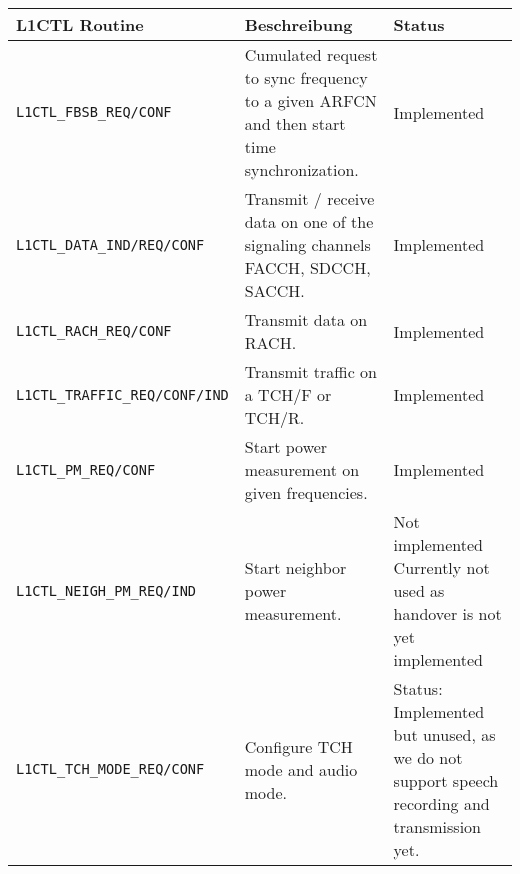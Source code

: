\begin{table}[H]
\begin{adjustbox}{max width={0.8\textwidth}, padding=4pt 2pt 4pt 0pt, center}
\begin{tabular}{|p{5cm}|p{5cm}|p{5cm}|}
\hline
\rowcolor[HTML]{F7F7F7}
\textbf{L1CTL Routine}                  & \textbf{Beschreibung}                                                                     & \textbf{Status}                                                                                             \\ \hline
\texttt{L1CTL\_FBSB\_REQ/CONF}                   & Cumulated request to sync frequency to a given ARFCN and then start time synchronization. & Implemented                                                                                                 \\ \hline
\texttt{L1CTL\_DATA\_IND/REQ/CONF}               & Transmit / receive data on one of the signaling channels FACCH, SDCCH, SACCH.             & Implemented                                                                                                 \\ \hline
\texttt{L1CTL\_RACH\_REQ/CONF}                   & Transmit data on RACH.                                                                    & Implemented                                                                                                 \\ \hline
\texttt{L1CTL\_TRAFFIC\_REQ/CONF/IND}            & Transmit traffic on a TCH/F or TCH/R.                                                     & Implemented                                                                                                 \\ \hline
\texttt{L1CTL\_PM\_REQ/CONF}                     & Start power measurement on given frequencies.                                             & Implemented                                                                                                 \\ \hline
\texttt{L1CTL\_NEIGH\_PM\_REQ/IND}               & Start neighbor power measurement.                                                         & Not implemented Currently not used as handover is not yet implemented                                       \\ \hline
\texttt{L1CTL\_TCH\_MODE\_REQ/CONF}              & Configure TCH mode and audio mode.                                                        & Status: Implemented but unused, as we do not support speech recording and transmission yet.                 \\ \hline

\end{tabular}
\end{adjustbox}
\end{table}
